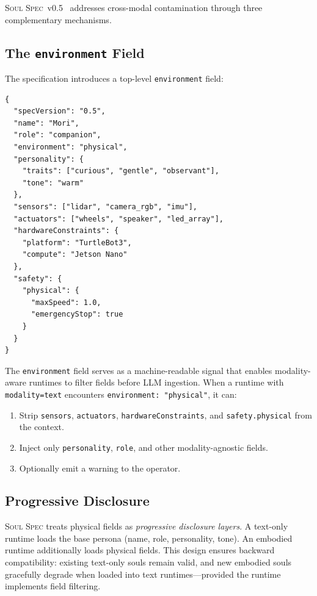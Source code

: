 \documentclass[manuscript,screen,nonacm]{acmart}
\begin{document}
\textsc{Soul Spec}~v0.5~\cite{clawsouls2026} addresses cross-modal contamination through three complementary mechanisms.

\subsection{The \texttt{environment} Field}

The specification introduces a top-level \texttt{environment} field:

\begin{lstlisting}[language={},caption={Soul Spec v0.5 with environment field}]
{
  "specVersion": "0.5",
  "name": "Mori",
  "role": "companion",
  "environment": "physical",
  "personality": {
    "traits": ["curious", "gentle", "observant"],
    "tone": "warm"
  },
  "sensors": ["lidar", "camera_rgb", "imu"],
  "actuators": ["wheels", "speaker", "led_array"],
  "hardwareConstraints": {
    "platform": "TurtleBot3",
    "compute": "Jetson Nano"
  },
  "safety": {
    "physical": {
      "maxSpeed": 1.0,
      "emergencyStop": true
    }
  }
}
\end{lstlisting}

The \texttt{environment} field serves as a machine-readable signal that enables modality-aware runtimes to filter fields before LLM ingestion.
When a runtime with \texttt{modality=text} encounters \texttt{environment: "physical"}, it can:
\begin{enumerate}
    \item Strip \texttt{sensors}, \texttt{actuators}, \texttt{hardwareConstraints}, and \texttt{safety.physical} from the context.
    \item Inject only \texttt{personality}, \texttt{role}, and other modality-agnostic fields.
    \item Optionally emit a warning to the operator.
\end{enumerate}

\subsection{Progressive Disclosure}

\textsc{Soul Spec} treats physical fields as \emph{progressive disclosure layers}.
A text-only runtime loads the base persona (name, role, personality, tone).
An embodied runtime additionally loads physical fields.
This design ensures backward compatibility: existing text-only souls remain valid, and new embodied souls gracefully degrade when loaded into text runtimes---provided the runtime implements field filtering.
\end{document}
